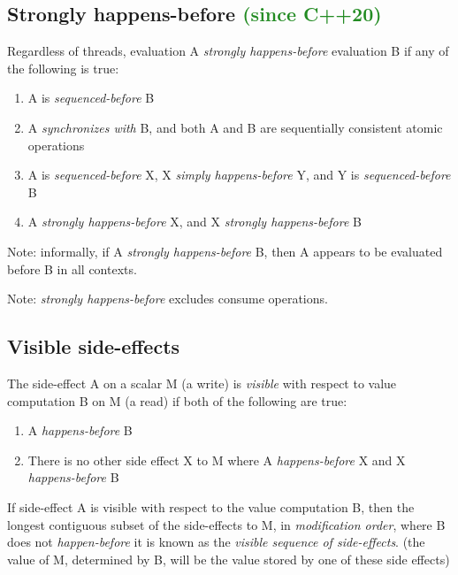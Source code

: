 \documentclass[a4paper,12pt,notitlepage,twoside,openright]{article}
\begin{document}
\subsection{Strongly happens-before \textcolor{ForestGreen}{(since C++20)}}

Regardless of threads, evaluation A \emph{strongly happens-before}
evaluation B if any of the following is true:

\begin{enumerate}

\item
  A is \emph{sequenced-before} B
\item
  A \emph{synchronizes with} B, and both A and B are sequentially
  consistent atomic operations
\item
  A is \emph{sequenced-before} X, X \emph{simply happens-before} Y, and
  Y is \emph{sequenced-before} B
\item
  A \emph{strongly happens-before} X, and X \emph{strongly
  happens-before} B
\end{enumerate}

Note: informally, if A \emph{strongly happens-before} B, then A appears
to be evaluated before B in all contexts.

Note: \emph{strongly happens-before} excludes consume operations.

\hypertarget{visible-side-effects}{%
\subsection{Visible side-effects}\label{visible-side-effects}}

The side-effect A on a scalar M (a write) is \emph{visible} with respect
to value computation B on M (a read) if both of the following are true:

\begin{enumerate}

\item
  A \emph{happens-before} B
\item
  There is no other side effect X to M where A \emph{happens-before} X
  and X \emph{happens-before} B
\end{enumerate}

If side-effect A is visible with respect to the value computation B,
then the longest contiguous subset of the side-effects to M, in
\emph{modification order}, where B does not \emph{happen-before} it is
known as the \emph{visible sequence of side-effects}. (the value of M,
determined by B, will be the value stored by one of these side effects)
\end{document}
